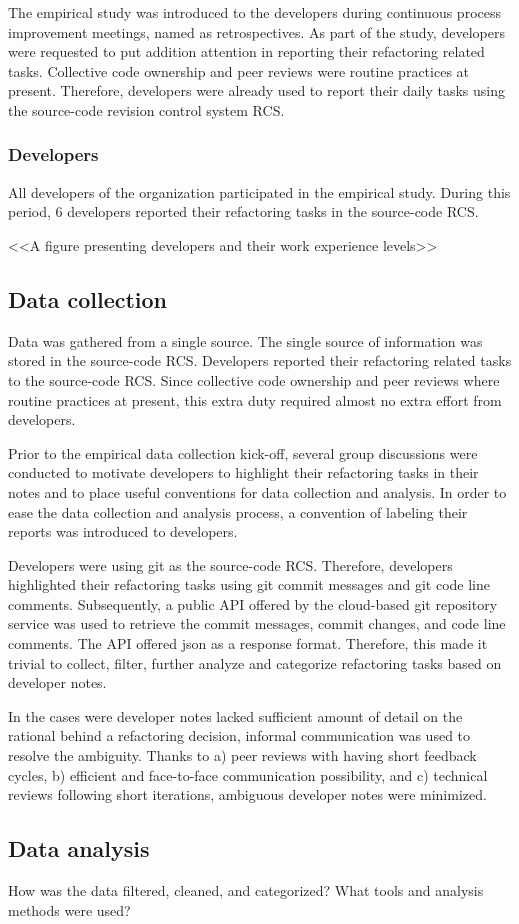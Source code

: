 The empirical study was introduced to the developers during continuous process improvement meetings, named as retrospectives. As part of the study, developers were requested to put addition attention in reporting their refactoring related tasks. Collective code ownership and peer reviews were routine practices at present. Therefore, developers were already used to report their daily tasks using the source-code revision control system \gls{RCS}. 

\subsubsection*{Developers} \label{developers}
All developers of the organization participated in the empirical study. During this period, 6 developers reported their refactoring tasks in the source-code \gls{RCS}.

<<A figure presenting developers and their work experience levels>>

\subsection{Data collection} \label{data collection}
Data was gathered from a single source. The single source of information was stored in the source-code \gls{RCS}. Developers reported their refactoring related tasks to the source-code \gls{RCS}. Since collective code ownership and peer reviews where routine practices at present, this extra duty required almost no extra effort from developers. 

Prior to the empirical data collection kick-off, several group discussions were conducted to motivate developers to highlight their refactoring tasks in their notes and to place useful conventions for data collection and analysis. In order to ease the data collection and analysis process, a convention of labeling their reports was introduced to developers.

Developers were using git as the source-code \gls{RCS}. Therefore, developers highlighted their refactoring tasks using git commit messages and git code line comments. Subsequently, a public API offered by the cloud-based git repository service was used to retrieve the commit messages, commit changes, and code line comments. The API offered json as a response format. Therefore, this made it trivial to collect, filter, further analyze and categorize refactoring tasks based on developer notes.  

In the cases were developer notes lacked sufficient amount of detail on the rational behind a refactoring decision, informal communication was used to resolve the ambiguity. Thanks to a) peer reviews with having short feedback cycles, b) efficient and face-to-face communication possibility, and c) technical reviews following short iterations, ambiguous developer notes were minimized. 

\subsection{Data analysis} \label{data analysis}
How was the data filtered, cleaned, and categorized? What tools and analysis methods were used?